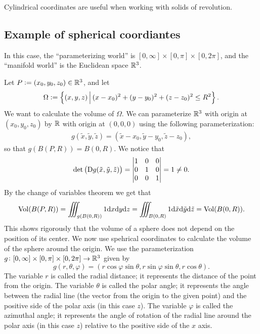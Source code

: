 \documentclass[11pt,a4paper]{article}
\begin{document}
\begin{remark}
  Cylindrical coordinates are useful when working with solids of revolution.
\end{remark}

\subsection{Example of spherical coordiantes}
In this case, the ``parameterizing world''
is $[0,\infty] \times [0,\pi] \times [0,2\pi]$,
and the ``manifold world'' is the Euclidean space $\mathbb{R}^3$.

\begin{example}
  Let $P := (x_0,y_0,z_0) \in \mathbb{R}^3$, and let
  \[
    \Omega :=
    \left\{(x,y,z) \,\middle\vert\, (x - x_0)^2 + (y - y_0)^2 + (z - z_0)^2 \le R^2\right\}.
  \]
  We want to calculate the volume of $\Omega$.
  We can parameterize $\mathbb{R}^3$ with origin at $(x_0,y_0,z_0)$
  by $\mathbb{R}$ with origin at $(0,0,0)$ using the following
  parameterization:
  \begin{gather*}
    g(\tilde x,\tilde y,\tilde z) =
    (\tilde x - x_0,\tilde y - y_0,\tilde z - z_0),
  \end{gather*}
  so that $g(B(P,R)) = B(0,R)$.
  We notice that
  \[
    \det\del{\Dif g(\tilde x,\tilde y,\tilde z)} =
    \begin{vmatrix}
      1 & 0 & 0 \\
      0 & 1 & 0 \\
      0 & 0 & 1
    \end{vmatrix} = 1 \neq 0.
  \]
  By the change of variables theorem we get that
  \[
    \Vol(B(P,R)) =
    \iiint_{g(B(0,R))} 1 \dx \dy \dz =
    \iiint_{B(0,R)} 1 \dif \tilde x \dif \tilde y \dif \tilde z =
    \Vol(B(0,R)).
  \]
  This shows rigorously that the volume of a sphere does not depend
  on the position of its center.
  We now use spehrical coordinates to calculate the volume of the sphere
  around the origin.
  We use the parameterization
  $g \colon [0,\infty] \times [0,\pi] \times [0,2\pi] \to \mathbb{R}^3$
  given by
  \[
    g(r,\theta,\varphi) =
    (r \cos \varphi \sin \theta, r \sin \varphi \sin \theta, r \cos \theta).
  \]
  The variable $r$ is called the radial distance; it represents
  the distance of the point from the origin.
  The variable $\theta$ is called the polar angle; it represents
  the angle between the radial line (the vector from the origin to
  the given point) and the positive side of the polar axis (in this case $z$).
  The variable $\varphi$ is called the azimuthal angle; it represents
  the angle of rotation of the radial line around the polar axis
  (in this case $z$)
  relative to the positive side of the $x$ axis.
  

\end{example}
\end{document}
